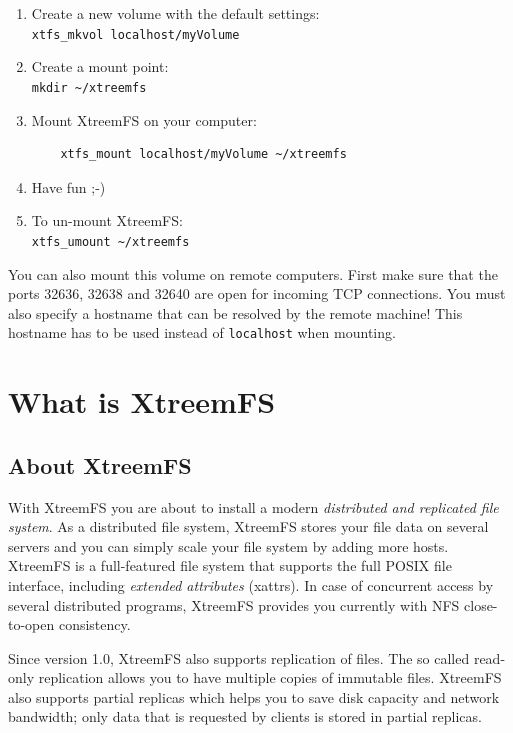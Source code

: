 \documentclass[a4paper,10pt]{book}
\begin{document}
\begin{enumerate}
\item Create a new volume with the default settings:\\
	\texttt{xtfs\_mkvol localhost/myVolume}

\item Create a mount point:\\
	\texttt{mkdir \~{}/xtreemfs}

\item Mount XtreemFS on your computer:
	\begin{verbatim}
	xtfs_mount localhost/myVolume ~/xtreemfs
	\end{verbatim}


\item Have fun ;-)

\item To un-mount XtreemFS:\\
	\texttt{xtfs\_umount \~{}/xtreemfs}
\end{enumerate}

You can also mount this volume on remote computers. First make sure that the ports 32636, 32638 and 32640 are open for incoming TCP connections. You must also specify a hostname that can be resolved by the remote machine! This hostname has to be used instead of \texttt{localhost} when mounting.

\chapter{What is XtreemFS}
\setcounter{page}{1}

\section{About XtreemFS}

With XtreemFS you are about to install a modern \emph{distributed and replicated file system}. As a distributed file system, XtreemFS stores your file data on several servers and you can simply scale your file system by adding more hosts. XtreemFS is a full-featured file system that supports the full POSIX file interface, including \emph{extended attributes} (xattrs). In case of concurrent access by several distributed programs, XtreemFS provides you currently with NFS close-to-open consistency.

Since version 1.0, XtreemFS also supports replication of files. The so called read-only replication allows you to have multiple copies of immutable files. XtreemFS also supports partial replicas which helps you to save disk capacity and network bandwidth; only data that is requested by clients is stored in partial replicas.
\end{document}
